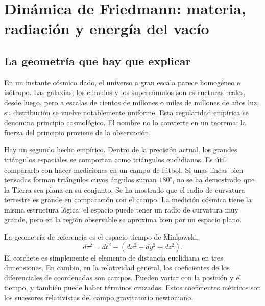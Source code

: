 \chapter{Dinámica de Friedmann: materia, radiación y energía del vacío}


\section{La geometría que hay que explicar}

En un instante cósmico dado, el universo a gran escala parece homogéneo e isótropo. Las galaxias, los cúmulos y los supercúmulos son estructuras reales, desde luego, pero a escalas de cientos de millones o miles de millones de años luz, su distribución se vuelve notablemente uniforme. Esta regularidad empírica se denomina principio cosmológico. El nombre no lo convierte en un teorema; la fuerza del principio proviene de la observación.

Hay un segundo hecho empírico. Dentro de la precisión actual, los grandes triángulos espaciales se comportan como triángulos euclidianos. Es útil compararlo con hacer mediciones en un campo de fútbol. Si unas líneas bien tensadas forman triángulos cuyos ángulos suman \(180^\circ\), no se ha demostrado que la Tierra sea plana en su conjunto. Se ha mostrado que el radio de curvatura terrestre es grande en comparación con el campo. La medición cósmica tiene la misma estructura lógica: el espacio puede tener un radio de curvatura muy grande, pero en la región observable se aproxima bien por un espacio plano.

La geometría de referencia es el espacio-tiempo de Minkowski,
\begin{equation}
  d\tau^2=dt^2-\left(dx^2+dy^2+dz^2\right).
  \label{eq:l09-minkowski}
\end{equation}
El corchete es simplemente el elemento de distancia euclidiana en tres dimensiones. En cambio, en la relatividad general, los coeficientes de los diferenciales de coordenadas son campos. Pueden variar con la posición y el tiempo, y también puede haber términos cruzados. Estos coeficientes métricos son los sucesores relativistas del campo gravitatorio newtoniano.

